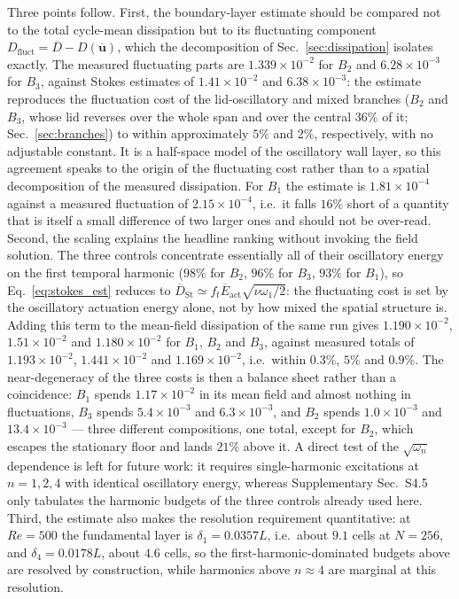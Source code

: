 \documentclass[11pt,a4paper]{article}
\newcommand{\Dbar}{\overline{D}}
\newenvironment{chgadd}{\par\color{blue}}{\par\color{black}}
\begin{document}
\begin{chgadd}
Three points follow. First, the boundary-layer estimate should be compared not to
the total cycle-mean dissipation but to its fluctuating component
$D_{\mathrm{fluct}}=\Dbar-D(\overline{\mathbf{u}})$, which the decomposition of
Sec.~\ref{sec:dissipation} isolates exactly. The measured fluctuating parts are
$1.339\times10^{-2}$ for $B_2$ and $6.28\times10^{-3}$ for $B_3$, against Stokes
estimates of $1.41\times10^{-2}$ and $6.38\times10^{-3}$: the estimate reproduces
the fluctuation cost of the lid-oscillatory and mixed branches ($B_2$ and $B_3$,
whose lid reverses over the whole span and over the central $36\%$ of it;
Sec.~\ref{sec:branches}) to within approximately $5\%$ and $2\%$, respectively,
with no adjustable constant. It is a half-space
model of the oscillatory wall layer, so this agreement speaks to the origin of the
fluctuating cost rather than to a spatial decomposition of the measured
dissipation. For $B_1$ the estimate is
$1.81\times10^{-4}$ against a measured fluctuation of $2.15\times10^{-4}$, i.e.\ it
falls $16\%$ short of a quantity that is itself a small difference of two larger
ones and should not be over-read. Second, the scaling
explains the headline ranking without invoking the field solution. The three
controls concentrate essentially all of their oscillatory energy on the first
temporal harmonic ($98\%$ for $B_2$, $96\%$ for $B_3$, $93\%$ for $B_1$), so
Eq.~\eqref{eq:stokes_est} reduces to
$\Dbar_{\mathrm{St}}\simeq f_t\overline{E}_{\mathrm{act}}\sqrt{\nu\omega_1/2}$:
the fluctuating cost is set by the oscillatory actuation energy alone, not by how
mixed the spatial structure is. Adding this term to the mean-field dissipation of
the same run gives $1.190\times10^{-2}$, $1.51\times10^{-2}$ and
$1.180\times10^{-2}$ for $B_1$, $B_2$ and $B_3$, against measured totals of
$1.193\times10^{-2}$, $1.441\times10^{-2}$ and $1.169\times10^{-2}$, i.e.\ within
$0.3\%$, $5\%$ and $0.9\%$. The near-degeneracy of the three costs is then a
balance sheet rather than a coincidence: $B_1$ spends $1.17\times10^{-2}$ in its
mean field and almost nothing in fluctuations, $B_3$ spends $5.4\times10^{-3}$ and
$6.3\times10^{-3}$, and $B_2$ spends $1.0\times10^{-3}$ and $13.4\times10^{-3}$
--- three different compositions, one total, except for $B_2$, which escapes the
stationary floor and lands $21\%$ above it. A direct test of the
$\sqrt{\omega_n}$ dependence is left for future work: it requires single-harmonic
excitations at $n=1,2,4$ with identical oscillatory energy, whereas
Supplementary Sec.~S4.5 only tabulates the harmonic budgets of the three controls
already used here. Third, the estimate also
makes the resolution requirement quantitative: at $Re=500$ the fundamental layer is
$\delta_1=0.0357L$, i.e.\ about $9.1$ cells at $N=256$, and $\delta_4=0.0178L$,
about $4.6$ cells, so the first-harmonic-dominated budgets above are resolved by
construction, while harmonics above $n\approx4$ are marginal at this resolution.
\end{chgadd}
\end{document}
